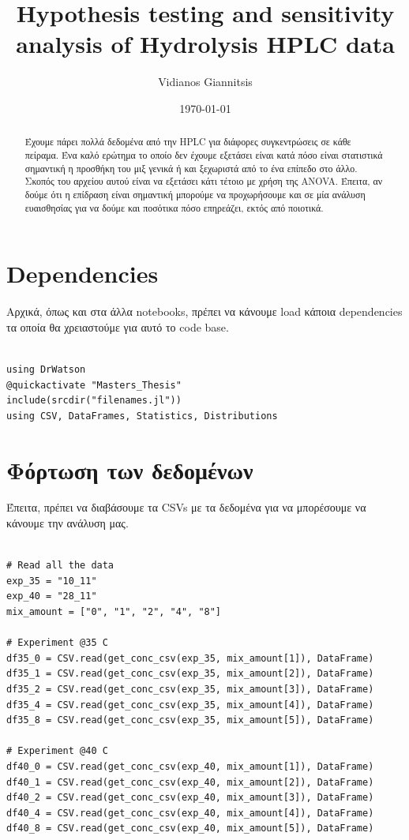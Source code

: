 \documentclass[11pt]{article}
\author{Vidianos Giannitsis}
\date{\today}
\title{Hypothesis testing and sensitivity analysis of Hydrolysis HPLC data}
\begin{document}
\maketitle
\tableofcontents

\begin{abstract}
Έχουμε πάρει πολλά δεδομένα από την HPLC για διάφορες συγκεντρώσεις σε κάθε πείραμα. Ένα καλό ερώτημα το οποίο δεν έχουμε εξετάσει είναι κατά πόσο είναι στατιστικά σημαντική η προσθήκη του μιξ γενικά ή και ξεχωριστά από το ένα επίπεδο στο άλλο. Σκοπός του αρχείου αυτού είναι να εξετάσει κάτι τέτοιο με χρήση της ANOVA. Έπειτα, αν δούμε ότι η επίδραση είναι σημαντική μπορούμε να προχωρήσουμε και σε μία ανάλυση ευαισθησίας για να δούμε και ποσότικα πόσο επηρεάζει, εκτός από ποιοτικά.
\end{abstract}

\section{Dependencies}
\label{sec:orgeaaee87}
Αρχικά, όπως και στα άλλα notebooks, πρέπει να κάνουμε load κάποια dependencies τα οποία θα χρειαστούμε για αυτό το code base.

\begin{verbatim}

using DrWatson
@quickactivate "Masters_Thesis"
include(srcdir("filenames.jl"))
using CSV, DataFrames, Statistics, Distributions

\end{verbatim}

\section{Φόρτωση των δεδομένων}
\label{sec:org5955c46}
Έπειτα, πρέπει να διαβάσουμε τα CSVs με τα δεδομένα για να μπορέσουμε να κάνουμε την ανάλυση μας.

\begin{verbatim}

# Read all the data
exp_35 = "10_11"
exp_40 = "28_11"
mix_amount = ["0", "1", "2", "4", "8"]

# Experiment @35 C
df35_0 = CSV.read(get_conc_csv(exp_35, mix_amount[1]), DataFrame)
df35_1 = CSV.read(get_conc_csv(exp_35, mix_amount[2]), DataFrame)
df35_2 = CSV.read(get_conc_csv(exp_35, mix_amount[3]), DataFrame)
df35_4 = CSV.read(get_conc_csv(exp_35, mix_amount[4]), DataFrame)
df35_8 = CSV.read(get_conc_csv(exp_35, mix_amount[5]), DataFrame)

# Experiment @40 C
df40_0 = CSV.read(get_conc_csv(exp_40, mix_amount[1]), DataFrame)
df40_1 = CSV.read(get_conc_csv(exp_40, mix_amount[2]), DataFrame)
df40_2 = CSV.read(get_conc_csv(exp_40, mix_amount[3]), DataFrame)
df40_4 = CSV.read(get_conc_csv(exp_40, mix_amount[4]), DataFrame)
df40_8 = CSV.read(get_conc_csv(exp_40, mix_amount[5]), DataFrame)

\end{verbatim}
\end{document}
